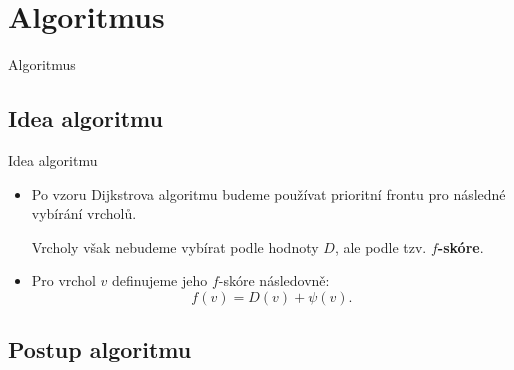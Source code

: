 \documentclass[11pt,professionalfont,aspectratio=43]{beamer}
\begin{document}
    \section{Algoritmus \Astar}

    \begin{titleframeenv}{Algoritmus \Astar}
    \end{titleframeenv}

    \subsection{Idea algoritmu}

    \begin{frame}{Idea algoritmu}
        \begin{itemize}
            \item Po vzoru Dijkstrova algoritmu budeme používat prioritní frontu pro následné vybírání vrcholů.
            \begin{timportantframe}
                \begin{center}
                    Vrcholy však nebudeme vybírat podle hodnoty $D$, ale podle tzv. \textbf{$f$-skóre}.
                \end{center}
            \end{timportantframe}
            \item Pro vrchol $v$ definujeme jeho $f$-skóre následovně:
            \[f(v)=D(v)+\psi(v).\]
        \end{itemize}
    \end{frame}

    \subsection{Postup algoritmu \Astar}
\end{document}
